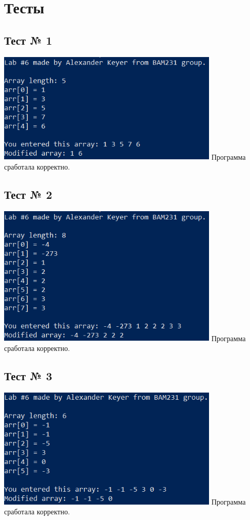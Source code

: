 \documentclass[12pt]{article}
\begin{document}
	\newpage
	
	\section*{Тесты}
	
	\subsection*{Тест № 1}
	\includegraphics[width=400px]{test_1}
	Программа сработала корректно.
	
	\subsection*{Тест № 2}
	\includegraphics[width=400px]{test_2}
	Программа сработала корректно.
	
	\subsection*{Тест № 3}
	\includegraphics[width=400px]{test_3}
	Программа сработала корректно.
	
\end{document}
